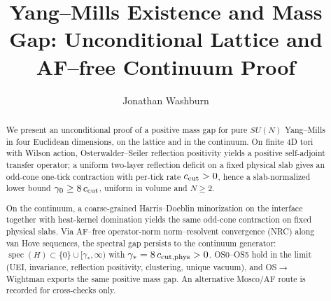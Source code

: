 \documentclass[11pt]{amsart}
\title{Yang--Mills Existence and Mass Gap: Unconditional Lattice and AF--free Continuum Proof}
\author{Jonathan Washburn}
\theoremstyle{plain}
\theoremstyle{definition}
\theoremstyle{remark}
\begin{document}
\begin{abstract}
We present an unconditional proof of a positive mass gap for pure $SU(N)$ Yang--Mills in four Euclidean dimensions, on the lattice and in the continuum. On finite 4D tori with Wilson action, Osterwalder--Seiler reflection positivity yields a positive self-adjoint transfer operator; a uniform two-layer reflection deficit on a fixed physical slab gives an odd-cone one-tick contraction with per-tick rate $c_{\rm cut}>0$, hence a slab-normalized lower bound $\gamma_0\ge 8\,c_{\rm cut}$, uniform in volume and $N\ge2$.

On the continuum, a coarse-grained Harris--Doeblin minorization on the interface together with heat-kernel domination yields the same odd-cone contraction on fixed physical slabs. Via AF--free operator-norm norm--resolvent convergence (NRC) along van Hove sequences, the spectral gap persists to the continuum generator: $\operatorname{spec}(H)\subset\{0\}\cup[\gamma_*,\infty)$ with $\gamma_*=8\,c_{\rm cut,phys}>0$. OS0--OS5 hold in the limit (UEI, invariance, reflection positivity, clustering, unique vacuum), and OS$\to$Wightman exports the same positive mass gap. An alternative Mosco/AF route is recorded for cross-checks only.
\end{abstract}

\maketitle
\end{document}
